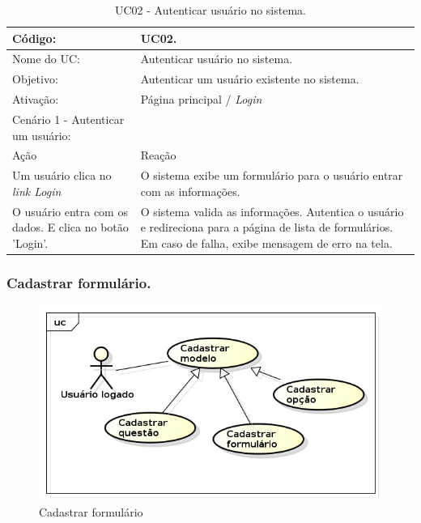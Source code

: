 \documentclass[11pt]{article}
\begin{document}
        \begin{table}[h]
          \begin{center}
            \begin{tabular}{ | p{7cm} | p{8cm} | }
              \hline
              Código: \cellcolor{gray} & UC02. \\
              \hline
              Nome do UC: \cellcolor{gray} & Autenticar usuário no sistema. \\
              \hline
              Objetivo: \cellcolor{gray} & Autenticar um usuário existente no sistema. \\
              \hline
              Ativação: \cellcolor{gray} & Página principal / \em Login \\
              \hline
              \hline
              Cenário 1 - Autenticar um usuário: &  \\
              \hline
              Ação\cellcolor{gray} & Reação\cellcolor{gray} \\
              \hline
              Um usuário clica no \em link Login & O sistema exibe um formulário para o usuário entrar com as informações. \\
              \hline
              O usuário entra com os dados. E clica no botão 'Login'. & O sistema valida as informações. Autentica o usuário e redireciona para a página de lista de formulários. Em caso de falha, exibe mensagem de erro na tela. \\
              \hline
            \end{tabular}
            \caption{UC02 - Autenticar usuário no sistema.}
          \end{center}
        \end{table}

    \clearpage

      \subsubsection{Cadastrar formulário.}

        \begin{figure}[h!]
          \centering
          \includegraphics[width=.5\textwidth]{cadastrar.png}
          \caption{Cadastrar formulário}
        \end{figure}
\end{document}

